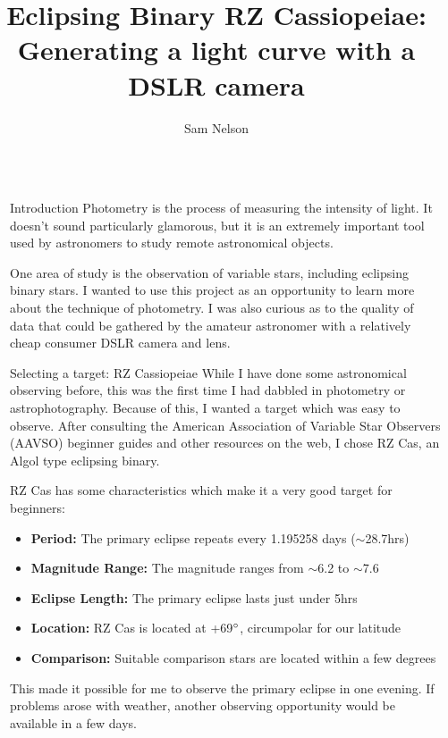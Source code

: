\documentclass[final]{beamer}
\title{Eclipsing Binary RZ Cassiopeiae: Generating a light curve with a DSLR camera}
\author{Sam Nelson}
\institute[shortinst]{Boise State University}
\newlength{\sepwidth}
\newlength{\colwidth}
\newcommand{\separatorcolumn}{\begin{column}{\sepwidth}\end{column}}
\begin{document}
\begin{frame}[t]
\begin{columns}[t]
\separatorcolumn

\begin{column}{\colwidth}
  \begin{block}{Introduction}
    Photometry is the process of measuring the intensity of light. It doesn't
    sound particularly glamorous, but it is an extremely important tool used
    by astronomers to study remote astronomical objects.

    One area of study is the observation of variable stars, including eclipsing
    binary stars. I wanted to use this project as an opportunity to learn more
    about the technique of photometry. I was also curious as to the quality of
    data that could be gathered by the amateur astronomer with a relatively cheap
    consumer DSLR camera and lens.
  \end{block}

  \begin{block}{Selecting a target: RZ Cassiopeiae}
    While I have done some astronomical observing before, this was the first time I 
    had dabbled in photometry or astrophotography. Because of this, I wanted a target which
    was easy to observe. After consulting the American Association of Variable Star Observers (AAVSO)
    beginner guides and other resources on the web, I chose RZ Cas, an Algol type
    eclipsing binary.

    RZ Cas has some characteristics which make it a very good target for beginners:

    \begin{itemize}
      \item \textbf{Period:} The primary eclipse repeats every 1.195258 days ($\sim$28.7hrs)
      \item \textbf{Magnitude Range:} The magnitude ranges from $\sim$6.2 to $\sim$7.6
      \item \textbf{Eclipse Length:} The primary eclipse lasts just under 5hrs
      \item \textbf{Location:} RZ Cas is located at +69$\degree$, circumpolar for our latitude
      \item \textbf{Comparison:} Suitable comparison stars are located within a few degrees
    \end{itemize}

    This made it possible for me to observe the primary eclipse in one evening. If 
    problems arose with weather, another observing opportunity would be available in 
    a few days.


\end{block}
\end{column}
\end{columns}
\end{frame}
\end{document}

